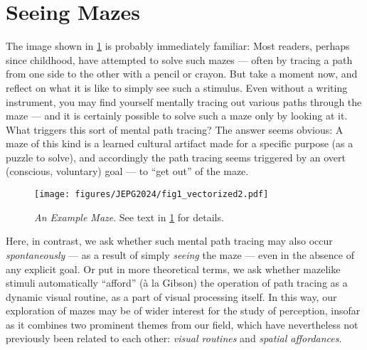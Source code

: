\section{Seeing Mazes}\label{sec:seeing_mazes}
The image shown in \cref{fig:JEPG2024_1} is probably immediately familiar: Most readers, perhaps since childhood, have attempted to solve such mazes --- often by tracing a path from one side to the other with a pencil or crayon. But take a moment now, and reflect on what it is like to simply see such a stimulus. Even without a writing instrument, you may find yourself mentally tracing out various paths through the maze --- and it is certainly possible to solve such a maze only by looking at it. What triggers this sort of mental path tracing? The answer seems obvious: A maze of this kind is a learned cultural artifact made for a specific purpose (as a puzzle to solve), and accordingly the path tracing seems triggered by an overt (conscious, voluntary) goal --- to “get out” of the maze.

\begin{figure}
    \centering
    \texttt{[image: figures/JEPG2024/fig1\_vectorized2.pdf]}
    \caption
    {\textit{An Example Maze}. See text in \cref{sec:seeing_mazes} for details.}
    \label{fig:JEPG2024_1}
\end{figure}

Here, in contrast, we ask whether such mental path tracing may also occur \textit{spontaneously} --- as a result of simply \textit{seeing} the maze --- even in the absence of any explicit goal. Or put in more theoretical terms, we ask whether mazelike stimuli automatically “afford” (à la Gibson) the operation of path tracing as a dynamic visual routine, as a part of visual processing itself. In this way, our exploration of mazes may be of wider interest for the study of perception, insofar as it combines two prominent themes from our field, which have nevertheless not previously been related to each other: \textit{visual routines} and \textit{spatial affordances}.


